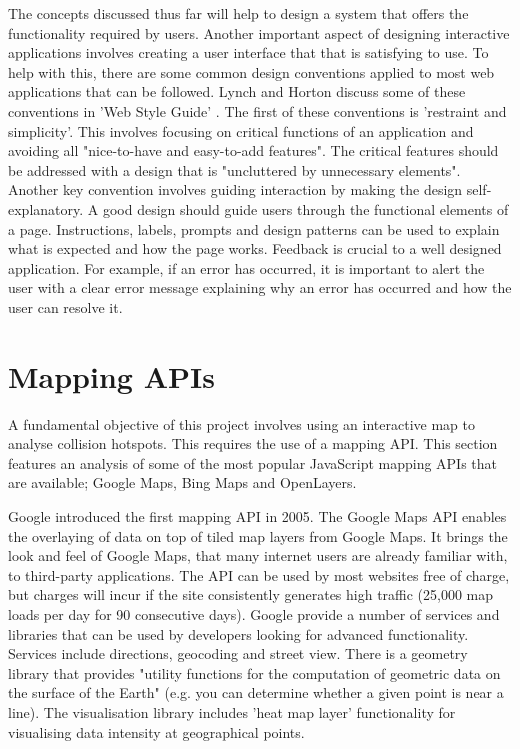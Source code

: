 \documentclass[authoryearcitations]{UoYCSproject}
\begin{document}
\begin{table}[tbp]
\begin{small}
\begin{tabular}{ p{2.0cm} p{9.0cm}  p{2.5cm} }
  \end{tabular}
  \end{small}
  \label{tab:designprinciples}
\end{table}

The concepts discussed thus far will help to design a system that offers the functionality required by users. Another important aspect of designing interactive applications involves creating a user interface that that is satisfying to use. To help with this, there are some common design conventions applied to most web applications that can be followed. Lynch and Horton discuss some of these conventions in 'Web Style Guide' \citep{Lynch2009}. The first of these conventions is 'restraint and simplicity'. This involves focusing on critical functions of an application and avoiding all "nice-to-have and easy-to-add features". The critical features should be addressed with a design that is "uncluttered by unnecessary elements". Another key convention involves guiding interaction by making the design self-explanatory. A good design should guide users through the functional elements of a page. Instructions, labels, prompts and design patterns can be used to explain what is expected and how the page works. Feedback is crucial to a well designed application. For example, if an error has occurred, it is important to alert the user with a clear error message explaining why an error has occurred and how the user can resolve it. 

\section{Mapping APIs}

A fundamental objective of this project involves using an interactive map to analyse collision hotspots. This requires the use of a mapping API. This section features an analysis of some of the most popular JavaScript mapping APIs that are available; Google Maps, Bing Maps and OpenLayers.  

Google introduced the first mapping API in 2005. The Google Maps API \citep{Google} enables the overlaying of data on top of tiled map layers from Google Maps. It brings the look and feel of Google Maps, that many internet users are already familiar with, to third-party applications. The API can be used by most websites free of charge, but charges will incur if the site consistently generates high traffic (25,000 map loads per day for 90 consecutive days). Google provide a number of services and libraries that can be used by developers looking for advanced functionality. Services include directions, geocoding and street view. There is a geometry library that provides "utility functions for the computation of geometric data on the surface of the Earth" (e.g. you can determine whether a given point is near a line). The visualisation library includes 'heat map layer' functionality for visualising data intensity at geographical points.
\end{document}

